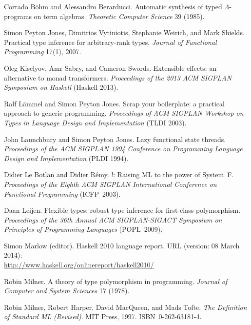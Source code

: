 \begin{thebibliography}{99}

Corrado B\"ohm and Alessandro Berarducci.
Automatic synthesis of typed $\Lambda$-programs on term algebras.
\emph{Theoretic Computer Science} 39 (1985).

Simon Peyton Jones, Dimitrios Vytiniotis, Stephanie Weirich, and
Mark Shields.
Practical type inference for arbitrary-rank types.
\emph{Journal of Functional Programming} 17(1), 2007.

Oleg Kiselyov, Amr Sabry, and Cameron Swords.
Extensible effects: an alternative to monad transformers.
\emph{Proceedings of the 2013 ACM SIGPLAN Symposium on Haskell}
(Haskell 2013).

Ralf L\"ammel and Simon Peyton Jones.
Scrap your boilerplate: a practical approach to generic
programming.
\emph{Proceedings of ACM SIGPLAN Workshop on Types in Language
Design and Implementation} (TLDI 2003).

John Launchbury and Simon Peyton Jones.
Lazy functional state threads.
\emph{Proceedings of the ACM SIGPLAN 1994 Conference on
Programming Language Design and Implementation} (PLDI 1994).

Didier Le Botlan and Didier R\'emy.
\MLF!: Raising ML to the power of System~F.
\emph{Proceedings of the Eighth ACM SIGPLAN International
Conference on Functional Programming} (ICFP~2003).

Daan Leijen.
Flexible types: robust type inference for first-class
polymorphism.
\emph{Proceedings of the 36th Annual ACM SIGPLAN-SIGACT Symposium
on Principles of Programming Languages} (POPL~2009).

Simon Marlow (editor).
Haskell 2010 language report.
URL (version: 08 March 2014):\\
\hbox{\url{http://www.haskell.org/onlinereport/haskell2010/}}

Robin Milner.
A theory of type polymorphism in programming.
\emph{Journal of Computer and System Sciences} 17 (1978).

Robin Milner, Robert Harper, David MacQueen, and Mads Tofte.
\emph{The Definition of Standard ML (Revised)}.
MIT Press, 1997. ISBN~0-262-63181-4.


\end{thebibliography}
